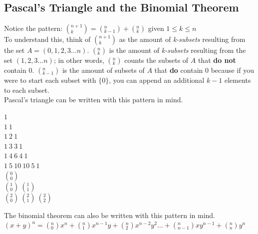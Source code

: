 \documentclass[a4paper,11pt]{article}
\begin{document}
\subsection{Pascal's Triangle and the Binomial Theorem}
Notice the pattern: $(^{n+1}_k)=(^n_{k-1})+(^n_k)$\vspace{5pt} given $1 \leq k \leq n$\\
To understand this, think of $(^{n+1}_k)$ as the amount of \textit{k-subsets} resulting from the set $A=(0,1,2,3\dots n)$.
$(^n_k)$ is the amount of \textit{k-subsets} resulting from the set $(1,2,3\dots n)$; in other words, $(^n_k)$ counts the subsets of $A$ that \textbf{do not} contain $0$.
$(^n_{k-1})$ is the amount of subsets of $A$ that \textbf{do} contain $0$ because if you were to start each subset with $\{0\}$, you can append an additional $k-1$ elements to each subset.\vspace{5pt}\\
Pascal's triangle can be written with this pattern in mind.
\begin{center}
 $1$\\
 $1~1$\\
 $1~2~1$\\
 $1~3~3~1$\\
 $1~4~6~4~1$\\
 $1~5~10~10~5~1$
 \vspace{5pt}\\
 $(^0_0)$\\
 $(^1_0)~(^1_1)$\\
 $(^2_0)~(^2_1)~(^2_2)$
\end{center}
The binomial theorem can also be written with this pattern in mind.\vspace{5pt}\\
$(x+y)^n=(^n_0)x^n+(^n_1)x^{n-1}y+(^n_2)x^{n-2}y^2\dots+(^n_{n-1})xy^{n-1}+(^n_n)y^n$
\end{document}
